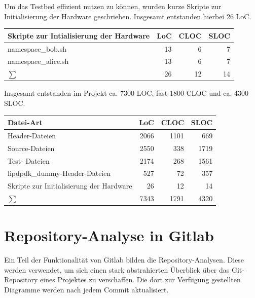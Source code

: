 \documentclass[../review_3.tex]{subfiles}
\begin{document}
\vspace{-0.2cm}
Um das Testbed effizient nutzen zu können, wurden kurze Skripte zur Initialisierung der Hardware geschrieben. Insgesamt entstanden hierbei 26 LoC.
\begin{longtable}[H]{p{10cm}rrr} \toprule
    \textbf{Skripte zur Intialisierung der Hardware} & \textbf{LoC} & \textbf{CLOC} & \textbf{SLOC} \\ \midrule \endhead
    namespace\_bob.sh                                & 13           & 6             & 7             \\
    namespace\_alice.sh                              & 13           & 6             & 7             \\
    \midrule
    $\sum$                                           & 26           & 12            & 14            \\ \bottomrule
\end{longtable}
\vspace{-0.2cm}
Insgesamt entstanden im Projekt ca. 7300 LOC, fast 1800 CLOC und ca. 4300 SLOC.
\begin{longtable} [H]{p{10cm}rrr}
    \toprule
    \textbf{Datei-Art}                       & \textbf{LoC} & \textbf{CLOC} & \textbf{SLOC} \\ \midrule \endhead
    Header-Dateien                           & 2066         & 1101          & 669           \\
    Source-Dateien                           & 2550         & 338           & 1719          \\
    Test- Dateien                            & 2174         & 268           & 1561          \\
    lipdpdk\_dummy-Header-Dateien            & 527          & 72            & 357           \\
    Skripte zur Initialisierung der Hardware & 26           & 12            & 14            \\\midrule
    $\sum$                                   & 7343         & 1791          & 4320          \\ \bottomrule
\end{longtable}

\section{Repository-Analyse in Gitlab}
Ein Teil der Funktionalität von Gitlab bilden die Repository-Analysen. Diese werden verwendet, um sich einen stark abstrahierten Überblick über das Git-Repository eines Projektes zu verschaffen. Die dort zur Verfügung gestellten Diagramme werden nach jedem Commit aktualisiert.
\end{document}
